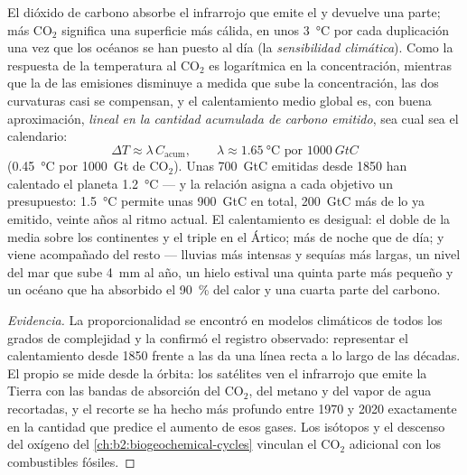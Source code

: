 \begin{proposition}\label{prop:b2:global-change:tcre}
El dióxido de carbono absorbe el infrarrojo que emite el  y devuelve
una parte; más \ensuremath{\mathrm{CO_2}} significa una superficie más cálida, en
unos \qty{3}{\celsius} por cada duplicación una vez que los océanos se han
puesto al día (la \emph{sensibilidad climática}). Como la respuesta de la
temperatura al \ensuremath{\mathrm{CO_2}} es logarítmica en la concentración, mientras
que la  de las emisiones disminuye a medida que sube
la concentración, las dos curvaturas casi se compensan, y el calentamiento
medio global es, con buena aproximación, \emph{lineal en la cantidad
acumulada de carbono emitido}, sea cual sea el calendario:
\[
\Delta T \approx \lambda\,C_{\text{acum}}, \qquad \lambda \approx
\qty{1.65}{\celsius} \text{ por } \qty{1000}{GtC}
\]
(\qty{0.45}{\celsius} por \qty{1000}{Gt} de \ensuremath{\mathrm{CO_2}}). Unas
\qty{700}{GtC} emitidas desde 1850 han calentado el planeta
\qty{1.2}{\celsius} --- y la relación asigna a cada objetivo un
presupuesto: \qty{1.5}{\celsius} permite unas \qty{900}{GtC} en total,
\qty{200}{GtC} más de lo ya emitido, veinte años al ritmo actual. El
calentamiento es desigual: el doble de la media sobre los continentes y el
triple en el Ártico; más de noche que de día; y viene acompañado del resto
--- lluvias más intensas y sequías más largas, un nivel del mar que sube
\qty{4}{mm} al año, un hielo estival una quinta parte más pequeño y un
océano que ha absorbido el \qty{90}{\%} del calor y una cuarta parte del
carbono.
\end{proposition}
\begin{proof}[Evidencia]
La proporcionalidad se encontró en modelos climáticos de todos los grados
de complejidad y la confirmó el registro observado: representar el
calentamiento desde 1850 frente a las  da una línea
recta a lo largo de las décadas. El propio  se mide desde
la órbita: los satélites ven el infrarrojo que emite la Tierra con las
bandas de absorción del \ensuremath{\mathrm{CO_2}}, del metano y del vapor de agua
recortadas, y el recorte se ha hecho más profundo entre 1970 y 2020
exactamente en la cantidad que predice el aumento de esos gases. Los
isótopos y el descenso del oxígeno del \cref{ch:b2:biogeochemical-cycles}
vinculan el \ensuremath{\mathrm{CO_2}} adicional con los combustibles fósiles.
\end{proof}
